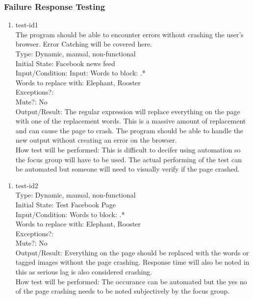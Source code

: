 \documentclass[12pt, titlepage]{article}
\begin{document}
\begin{enumerate}
\subsubsection{Failure Response Testing} %
\begin{enumerate}
\item{test-id1\\}
The program should be able to encounter errors without crashing the user's browser. Error Catching will be covered here. \\
Type: Dynamic, manual, non-functional \\
Initial State: Facebook news feed \\
Input/Condition: Input: Words to block: .* \\
Words to replace with: Elephant, Rooster \\
Exceptions?: \\
Mute?: No\\					
Output/Result: The regular expression will replace everything on the page with one of the replacement words. This is a massive amount of replacement and can cause the page to crash. The program should be able to handle the new output without creating an error on the browser.	\\				
How test will be performed: This is difficult to decifer using automation so the focus group will have to be used. The actual performing of the test can be automated but someone will need to visually verify if the page crashed.
\end{enumerate}
\begin{enumerate}
\item{test-id2\\}
Type: Dynamic, manual, non-functional \\
Initial State: Test Facebook Page \\
Input/Condition: Words to block: .* \\
Words to replace with: Elephant, Rooster \\
Exceptions?: \\
Mute?: No \\			
Output/Result: Everything on the page should be replaced with the words or tagged images without the page crashing. Response time will also be noted in this as serious lag is also considered crashing. \\		
How test will be performed: The occurance can be automated but the yes no of the page crashing needs to be noted subjectively by the focus group.
\end{enumerate}

\end{enumerate}
\end{document}
